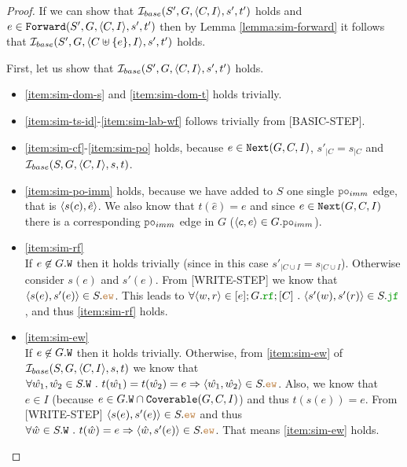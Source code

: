 \documentclass[12pt]{article}
\begin{document}
\begin{proof}
  If we can show that $\mathcal{I}_{base}(S', G, \langle C, I \rangle, s', t')$ holds and
  $e \in {\mathtt{Forward}}(S', G, \langle C, I \rangle, s', t')$ then by Lemma \ref{lemma:sim-forward}
  it follows that $\mathcal{I}_{base}(S', G, \langle C \uplus \{e\}, I \rangle, s', t')$ holds.

  First, let us show that $\mathcal{I}_{base}(S', G, \langle C, I \rangle, s', t')$ holds.

  \begin{itemize}

  \item \ref{item:sim-dom-s} and \ref{item:sim-dom-t} holds trivially.

  \item \ref{item:sim-ts-id}-\ref{item:sim-lab-wf} follows trivially from [BASIC-STEP].

  \item \ref{item:sim-cf}-\ref{item:sim-po} holds, because
    $e \in {\mathtt{Next}}(G, C, I)$,
    $s'_{|C} = s_{|C}$ and $\mathcal{I}_{base}(S, G, \langle C, I \rangle, s, t)$.

  \item \ref{item:sim-po-imm} holds, because we have added to $S$
    one single $\lPO_{imm}$ edge, that is $\langle s(c), \hat{e} \rangle$.
    We also know that $t(\hat{e}) = e$ and since $e \in {\mathtt{Next}}(G, C, I)$
    there is a corresponding $\lPO_{imm}$ edge in $G$ ($\tup{c, e} \in G.\lPO_{imm}$).

  \item \ref{item:sim-rf} \\
    If $e \not\in G.{\mathtt{W}}$ then it holds trivially
    (since in this case $s'_{|C \cup I} = s_{|C \cup I}$).
    Otherwise consider $s(e)$ and $s'(e)$.
    From [WRITE-STEP] we know that $\tup{s(e), s'(e)} \in S.\lEW$.
    This leads to 
    $\forall{\tup{w, r} \in [e];G.\lRF;[C]} ~.~ \tup{s'(w), s'(r)} \in S.\lJF$,
    and thus \ref{item:sim-rf} holds.

  \item \ref{item:sim-ew} \\
    If $e \not\in G.{\mathtt{W}}$ then it holds trivially.
    Otherwise, from \ref{item:sim-ew} of $\mathcal{I}_{base}(S, G, \langle C, I \rangle, s, t)$ we know that
    $\forall{\hat{w_1}, \hat{w_2} \in S.\lW} ~.~ t(\hat{w_1}) = t(\hat{w_2}) = e
    \Rightarrow \tup{\hat{w_1}, \hat{w_2}} \in S.\lEW$.
    Also, we know that $e \in I$ (because $e \in G.{\mathtt{W}} \cap {\mathtt{Coverable}}(G, C, I)$)
    and thus $t(s(e)) = e$.
    From [WRITE-STEP] $\tup{s(e), s'(e)} \in S.\lEW$ and thus
    $\forall{\hat{w} \in S.\lW}~.~ t(\hat{w}) = e \Rightarrow \tup{\hat{w}, s'(e)} \in S.\lEW$.
    That means \ref{item:sim-ew} holds.
      
  
  \end{itemize}
\end{proof}
\end{document}
